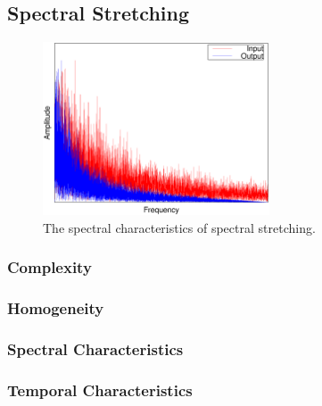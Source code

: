 	\subsection{Spectral Stretching}
	\label{sec:Excitation-SpectralStretching}

		\begin{figure}[h!]
			\centering
			\includegraphics[width=0.6\textwidth]{chapter3/Images/SpectralStretchingSpectrum.eps}
			\caption{The spectral characteristics of spectral stretching.}
			\label{fig:SpectralStretching}
		\end{figure}

		\subsubsection*{Complexity}
		\subsubsection*{Homogeneity}
		\subsubsection*{Spectral Characteristics}
		\subsubsection*{Temporal Characteristics}


